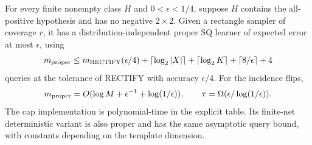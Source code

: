 \begin{theorem}\label{thm:proper}
For every finite nonempty class $H$ and $0<\epsilon<1/4$, suppose $H$ contains the all-positive hypothesis and has no negative $2\times2$. Given a rectangle sampler of coverage $r$, it has a distribution-independent proper SQ learner of expected error at most $\epsilon$, using
\begin{equation}\label{eq:propercomplexity}
 m_{\rm proper}\le m_{\rm RECTIFY}(\epsilon/4)
 +\lceil\log_2|X|\rceil+\lceil\log_2K\rceil
 +\lceil8/\epsilon\rceil+4
\end{equation}
queries at the tolerance of RECTIFY with accuracy $\epsilon/4$. For the incidence flips,
\[
 m_{\rm proper}=O(\log M+\epsilon^{-1}+\log(1/\epsilon)),\qquad
 \tau=\Omega(\epsilon/\log(1/\epsilon)).
\]
The cap implementation is polynomial-time in the explicit table. Its finite-net deterministic variant is also proper and has the same asymptotic query bound, with constants depending on the template dimension.
\end{theorem}

